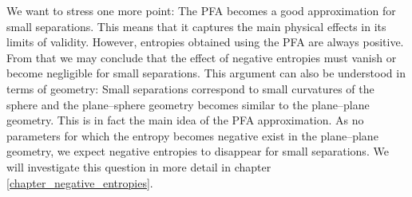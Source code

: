We want to stress one more point: The PFA becomes a good approximation for
small separations. This means that it captures the main physical effects in its
limits of validity. However, entropies obtained using the PFA are always positive.
From that we may conclude that the effect of negative entropies must vanish or
become negligible for small separations. This argument can also be understood
in terms of geometry: Small separations correspond to small curvatures of the
sphere and the plane--sphere geometry becomes similar to the plane--plane
geometry. This is in fact the main idea of the PFA approximation. As no
parameters for which the entropy becomes negative exist in the plane--plane
geometry, we expect negative entropies to disappear for small separations.
We will investigate this question in more detail
in chapter \ref{chapter_negative_entropies}.
